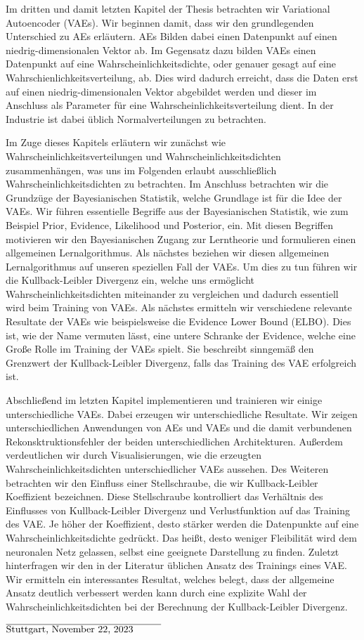 \documentclass[11pt, twoside, a4paper]{book}
\theoremstyle{plain}
\theoremstyle{definition}
\theoremstyle{plain}
\begin{document}
Im dritten und damit letzten Kapitel der Thesis betrachten wir Variational Autoencoder (VAEs). Wir beginnen damit, dass wir den grundlegenden Unterschied zu AEs erläutern. AEs Bilden dabei einen Datenpunkt auf einen niedrig-dimensionalen Vektor ab. Im Gegensatz dazu bilden VAEs einen Datenpunkt auf eine Wahrscheinlichkeitsdichte, oder genauer gesagt auf eine Wahrschienlichkeitsverteilung, ab. Dies wird dadurch erreicht, dass die Daten erst auf einen niedrig-dimensionalen Vektor abgebildet werden und dieser im Anschluss als Parameter für eine Wahrscheinlichkeitsverteilung dient. In der Industrie ist dabei üblich Normalverteilungen zu betrachten.

Im Zuge dieses Kapitels erläutern wir zunächst wie Wahrscheinlichkeitsverteilungen und Wahrscheinlichkeitsdichten zusammenhängen, was uns im Folgenden erlaubt ausschließlich Wahrscheinlichkeitsdichten zu betrachten. Im Anschluss betrachten wir die Grundzüge der Bayesianischen Statistik, welche Grundlage ist für die Idee der VAEs. Wir führen essentielle Begriffe aus der Bayesianischen Statistik, wie zum Beispiel \glqq Prior\grqq{}, \glqq Evidence\grqq{}, \glqq Likelihood\grqq{} und \glqq Posterior\grqq{}, ein. Mit diesen Begriffen motivieren wir den Bayesianischen Zugang zur Lerntheorie und formulieren einen allgemeinen Lernalgorithmus. Als nächstes beziehen wir diesen allgemeinen Lernalgorithmus auf unseren speziellen Fall der VAEs. Um dies zu tun führen wir die Kullback-Leibler Divergenz ein, welche uns ermöglicht Wahrscheinlichkeitsdichten miteinander zu vergleichen und dadurch essentiell wird beim Training von VAEs. Als nächstes ermitteln wir verschiedene relevante Resultate der VAEs wie beispielsweise die \glqq Evidence Lower Bound\grqq{} (ELBO). Dies ist, wie der Name vermuten lässt, eine untere Schranke der Evidence, welche eine Große Rolle im Training der VAEs spielt. Sie beschreibt sinngemäß den Grenzwert der Kullback-Leibler Divergenz, falls das Training des VAE erfolgreich ist.

Abschließend im letzten Kapitel implementieren und trainieren wir einige unterschiedliche VAEs. Dabei erzeugen wir unterschiedliche Resultate. Wir zeigen unterschiedlichen Anwendungen von AEs und VAEs und die damit verbundenen Rekonsktruktionsfehler der beiden unterschiedlichen Architekturen. Außerdem verdeutlichen wir durch Visualisierungen, wie die erzeugten Wahrscheinlichkeitsdichten unterschiedlicher VAEs aussehen.
Des Weiteren betrachten wir den Einfluss einer Stellschraube, die wir Kullback-Leibler Koeffizient bezeichnen. Diese Stellschraube kontrolliert das Verhältnis des Einflusses von Kullback-Leibler Divergenz und Verlustfunktion auf das Training des VAE. Je höher der Koeffizient, desto stärker werden die Datenpunkte auf eine Wahrscheinlichkeitsdichte \glqq gedrückt\grqq{}. Das heißt, desto weniger Fleibilität wird dem neuronalen Netz gelassen, selbst eine geeignete Darstellung zu finden.
Zuletzt hinterfragen wir den in der Literatur üblichen Ansatz des Trainings eines VAE. Wir ermitteln ein interessantes Resultat, welches belegt, dass der allgemeine Ansatz deutlich verbessert werden kann durch eine explizite Wahl der Wahrscheinlichkeitsdichten bei der Berechnung der Kullback-Leibler Divergenz.




\vspace{4 cm}

$\overline{\text{Stuttgart, November 22, 2023} \hspace{1 cm}}$
\end{document}
